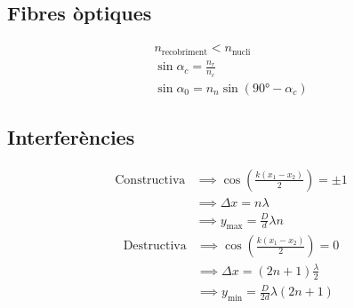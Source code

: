 \documentclass[10pt,twocolumn]{article}
\begin{document}
\subsection{Fibres òptiques}
\begin{gather*}
    n_\text{recobriment} < n_\text{nucli} \\
    \sin \alpha_c = \frac{n_r}{n_c} \\
    \sin \alpha_0 = n_n \sin\left(\ang{90}-\alpha_c\right)
\end{gather*}
\subsection{Interferències}
\begin{align*}
        \text{Constructiva} &\implies \cos\left(\frac{k\left(x_1-x_2\right)}{2}\right) = \pm 1 \\
                            &\implies \Delta x = n\lambda \\
                            &\implies y_\text{max} = \frac{D}{d}\lambda n
\end{align*}
\begin{align*}
        \text{Destructiva} &\implies \cos\left(\frac{k\left(x_1-x_2\right)}{2}\right) = 0 \\
                           &\implies \Delta x = \left(2n+1\right)\frac{\lambda}{2} \\
                           &\implies y_\text{min} = \frac{D}{2d}\lambda \left(2n+1\right)
\end{align*}
\end{document}
